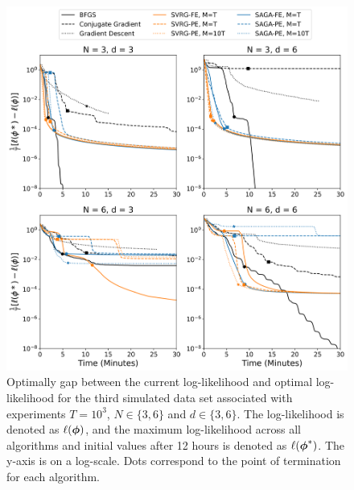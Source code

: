\documentclass[12pt]{article}
\begin{document}
\begin{figure}[H]
    \centering
    \includegraphics[width=6.5in]{../plt/log-like_v_time_T-1000-002.png}
    \caption{Optimally gap between the current log-likelihood and optimal log-likelihood for the third simulated data set associated with experiments $T=10^{3}$, $N \in \{3,6\}$ and $d \in \{3,6\}$. The log-likelihood is denoted as $\ell(\boldsymbol{\phi})$, and the maximum log-likelihood across all algorithms and initial values after 12 hours is denoted as $\ell(\boldsymbol{\phi}^*)$. The y-axis is on a log-scale. Dots correspond to the point of termination for each algorithm.}
\end{figure}
%
\end{document}
